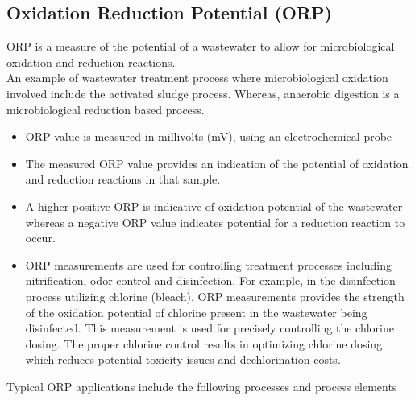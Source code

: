 \subsection{Oxidation Reduction Potential (ORP)}			
			ORP is a measure of the potential of a wastewater to allow for microbiological oxidation and reduction reactions.\\
			An example of wastewater treatment process where microbiological oxidation involved include the activated sludge process.  Whereas, anaerobic digestion is a microbiological reduction based process.
			\begin{itemize}
				\item ORP value is measured in millivolts (mV), using an electrochemical probe
				\item The measured ORP value provides an indication of the potential of oxidation and reduction reactions in that sample.
				\item A higher positive ORP is indicative of oxidation potential of the wastewater whereas a negative ORP value indicates potential for a reduction reaction to occur.
				\item ORP measurements are used for controlling treatment processes including nitrification, odor control and disinfection.  For example, in the disinfection process utilizing chlorine (bleach), ORP measurements provides the strength of the oxidation potential of chlorine present in the wastewater being disinfected.  This measurement is used for precisely controlling the chlorine dosing.  The proper chlorine control results in optimizing chlorine dosing which reduces potential toxicity issues and dechlorination costs.
			\end{itemize}
			Typical ORP applications include the following processes and process elements
			
